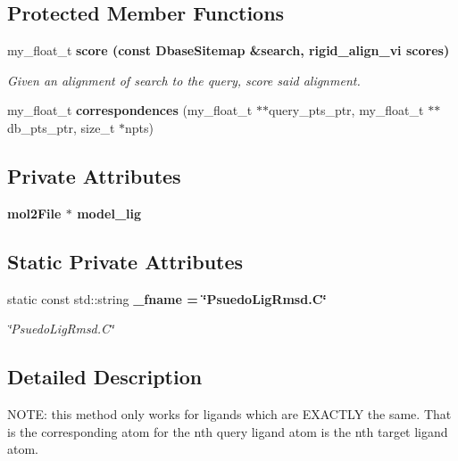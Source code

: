 \subsection*{Protected Member Functions}
\begin{CompactItemize}
\item 
my\_\-float\_\-t \bf{score} (const \bf{Dbase\-Sitemap} \&search, rigid\_\-align\_\-vi scores)
\begin{CompactList}\small\item\em Given an alignment of search to the query, score said alignment. \item\end{CompactList}\item 
my\_\-float\_\-t \textbf{correspondences} (my\_\-float\_\-t $\ast$$\ast$query\_\-pts\_\-ptr, my\_\-float\_\-t $\ast$$\ast$db\_\-pts\_\-ptr, size\_\-t $\ast$npts)\label{classSimSite3D_1_1PsuedoLigRmsd_69e79ac94abe9233c291ecaccc6cae2e}

\end{CompactItemize}
\subsection*{Private Attributes}
\begin{CompactItemize}
\item 
\bf{mol2File} $\ast$ \textbf{model\_\-lig}\label{classSimSite3D_1_1PsuedoLigRmsd_c2c74580d19f2a232ad85eec12641ebe}

\end{CompactItemize}
\subsection*{Static Private Attributes}
\begin{CompactItemize}
\item 
static const std::string \bf{\_\-fname} = \char`\"{}Psuedo\-Lig\-Rmsd.C\char`\"{}\label{classSimSite3D_1_1PsuedoLigRmsd_2f21de3bff3a23947a0f443dd906c0bc}

\begin{CompactList}\small\item\em \char`\"{}Psuedo\-Lig\-Rmsd.C\char`\"{} \item\end{CompactList}\end{CompactItemize}


\subsection{Detailed Description}
NOTE: this method only works for ligands which are EXACTLY the same. That is the corresponding atom for the nth query ligand atom is the nth target ligand atom. 



